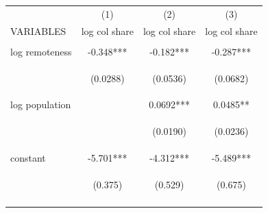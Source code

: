 \documentclass[12 pt]{article}
\begin{document}
\begin{table}
    \centering
    \begin{tabular}{lccc} \hline
     & (1) & (2) & (3) \\
    VARIABLES & log col share & log col share & log col share \\ \hline
    \vspace{4pt} & \begin{footnotesize}\end{footnotesize} & \begin{footnotesize}\end{footnotesize} & \begin{footnotesize}\end{footnotesize} \\
    log remoteness & -0.348*** & -0.182*** & -0.287*** \\
    \vspace{4pt} & \begin{footnotesize}(0.0288)\end{footnotesize} & \begin{footnotesize}(0.0536)\end{footnotesize} & \begin{footnotesize}(0.0682)\end{footnotesize} \\
    log population &  & 0.0692*** & 0.0485** \\
    \vspace{4pt} & \begin{footnotesize}\end{footnotesize} & \begin{footnotesize}(0.0190)\end{footnotesize} & \begin{footnotesize}(0.0236)\end{footnotesize} \\
    constant & -5.701*** & -4.312*** & -5.489*** \\
     & \begin{footnotesize}(0.375)\end{footnotesize} & \begin{footnotesize}(0.529)\end{footnotesize} & \begin{footnotesize}(0.675)\end{footnotesize} \\
    \vspace{4pt} & \begin{footnotesize}\end{footnotesize} & \begin{footnotesize}\end{footnotesize} & \begin{footnotesize}\end{footnotesize} \\

\end{tabular}
\end{table}
\end{document}
